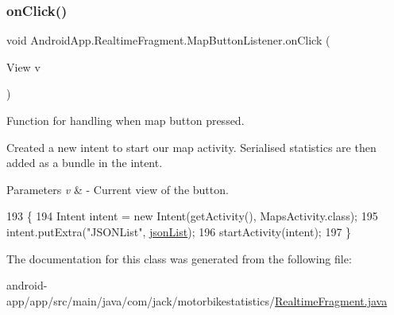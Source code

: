\subsubsection{\texorpdfstring{on\+Click()}{onClick()}}
{\footnotesize\ttfamily void Android\+App.\+Realtime\+Fragment.\+Map\+Button\+Listener.\+on\+Click (\begin{DoxyParamCaption}\item[{View}]{v }\end{DoxyParamCaption})\hspace{0.3cm}{\ttfamily [inline]}}



Function for handling when map button pressed. 

Created a new intent to start our map activity. Serialised statistics are then added as a bundle in the intent.


\begin{DoxyParams}{Parameters}
{\em v} & -\/ Current view of the button. \\
\hline
\end{DoxyParams}

\begin{DoxyCode}
193                                   \{
194           Intent intent = \textcolor{keyword}{new} Intent(getActivity(), MapsActivity.class);
195           intent.putExtra(\textcolor{stringliteral}{"JSONList"}, \hyperlink{class_android_app_1_1_realtime_fragment_a4c3f12bcaaab715dc512d4cd4a4c11cf}{jsonList});
196           startActivity(intent);
197       \}
\end{DoxyCode}


The documentation for this class was generated from the following file\+:\begin{DoxyCompactItemize}
\item 
android-\/app/app/src/main/java/com/jack/motorbikestatistics/\hyperlink{_realtime_fragment_8java}{Realtime\+Fragment.\+java}\end{DoxyCompactItemize}
